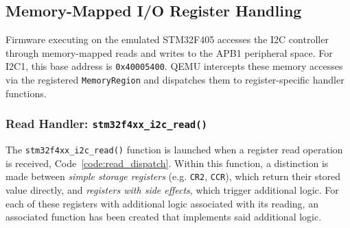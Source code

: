 \subsection{Memory-Mapped I/O Register Handling}
\label{sec:mmio_handling}

Firmware executing on the emulated STM32F405 accesses the I2C controller through 
memory-mapped reads and writes to the APB1 peripheral space. For I2C1, this base 
address is \texttt{0x40005400}. QEMU intercepts these memory accesses via the registered 
\texttt{MemoryRegion} and dispatches them to register-specific handler functions.

\subsubsection{Read Handler: \texttt{stm32f4xx\_i2c\_read()}}
\label{subsec:read_handler}

The \texttt{stm32f4xx\_i2c\_read()} function is launched when a register read operation is received, Code~\ref{code:read_dispatch}. 
Within this function, a distinction is made between \emph{simple storage registers} 
(e.g. \texttt{CR2}, \texttt{CCR}), which return their stored value directly, and \emph{registers with side 
effects}, which trigger additional logic. For each of these registers with additional logic 
associated with its reading, an associated function has been created that implements 
said additional logic.

